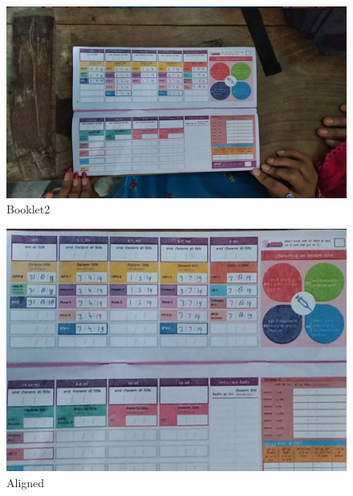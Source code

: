 \documentclass{article}
\begin{document}
\pagebreak
    \begin{figure}[!htb]
    \minipage{\textwidth}
    \begin{center}
      \includegraphics[scale=.25]{4/.report/_orig/b2.jpg}
      \caption{Booklet2}
    \end{center}
    \endminipage
    \end{figure}
    \begin{figure}[!htb]
    \minipage{\textwidth}
    \begin{center}
      \includegraphics[scale=.2]{4/.report/_aligned/b2.jpg}
      \caption{Aligned}
    \end{center}
    \endminipage
    \end{figure}
    \pagebreak
\end{document}
